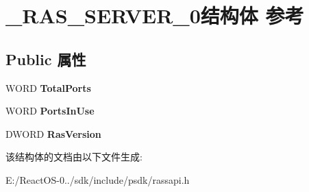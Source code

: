 \hypertarget{struct___r_a_s___s_e_r_v_e_r__0}{}\section{\+\_\+\+R\+A\+S\+\_\+\+S\+E\+R\+V\+E\+R\+\_\+0结构体 参考}
\label{struct___r_a_s___s_e_r_v_e_r__0}
\subsection*{Public 属性}
\begin{DoxyCompactItemize}
\item 
\mbox{\label{struct___r_a_s___s_e_r_v_e_r__0_a59de272623b6afbbdda8b8e5a65e78cf}} 
W\+O\+RD {\bfseries Total\+Ports}
\item 
\mbox{\label{struct___r_a_s___s_e_r_v_e_r__0_a6c93737118b036d97a37b324a6f1a656}} 
W\+O\+RD {\bfseries Ports\+In\+Use}
\item 
\mbox{\label{struct___r_a_s___s_e_r_v_e_r__0_a1b5a18c97d9faba4979c123d45d4cb2e}} 
D\+W\+O\+RD {\bfseries Ras\+Version}
\end{DoxyCompactItemize}


该结构体的文档由以下文件生成\+:\begin{DoxyCompactItemize}
\item 
E\+:/\+React\+O\+S-\/0../sdk/include/psdk/rassapi.\+h\end{DoxyCompactItemize}
